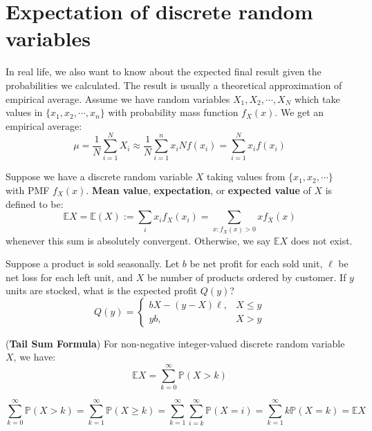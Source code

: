 \documentclass{huhtakm-template-book}
\newcommand{\prob}{\mathbb{P}}
\newcommand{\expect}{\mathbb{E}}
\begin{document}
\section{Expectation of discrete random variables}
In real life, we also want to know about the expected final result given the probabilities we calculated. The result is usually a theoretical approximation of empirical average. Assume we have random variables $X_{1},X_{2},\cdots,X_{N}$ which take values in $\{x_{1},x_{2},\cdots,x_{n}\}$ with probability mass function $f_{X}(x)$. We get an empirical average:
\begin{equation*}
	\mu=\frac{1}{N}\sum_{i=1}^{N}X_{i}\approx\frac{1}{N}\sum_{i=1}^{n}x_{i}Nf(x_{i})=\sum_{i=1}^{N}x_{i}f(x_{i})
\end{equation*}
\begin{defn}
	Suppose we have a discrete random variable $X$ taking values from $\{x_{1},x_{2},\cdots\}$ with PMF $f_{X}(x)$. \textbf{Mean value}, \textbf{expectation}, or \textbf{expected value} of $X$ is defined to be:
	\begin{equation*}
		\expect X=\expect(X):=\sum_{i}x_{i}f_{X}(x_{i})=\sum_{x:f_{X}(x)>0}xf_{X}(x)
	\end{equation*}
	whenever this sum is absolutely convergent. Otherwise, we say $\expect X$ does not exist.
\end{defn}
\begin{eg}
	Suppose a product is sold seasonally. Let $b$ be net profit for each sold unit, $\ell$ be net loss for each left unit, and $X$ be number of products ordered by customer. If $y$ units are stocked, what is the expected profit $Q(y)$?
	\begin{equation*}
		Q(y)=\begin{cases}
			bX-(y-X)\ell, &X\leq y\\
			yb, &X>y
		\end{cases}
	\end{equation*}
\end{eg}
\begin{thm}(\textbf{Tail Sum Formula})
	For non-negative integer-valued discrete random variable $X$, we have:
	\begin{equation*}
		\expect{X}=\sum_{k=0}^{\infty}\prob(X>k)
	\end{equation*}
\end{thm}
\begin{proofing}
	\begin{equation*}
		\sum_{k=0}^{\infty}\prob(X>k)=\sum_{k=1}^{\infty}\prob(X\geq k)=\sum_{k=1}^{\infty}\sum_{i=k}^{\infty}\prob(X=i)=\sum_{k=1}^{\infty}k\prob(X=k)=\expect X
	\end{equation*}
\end{proofing}
\end{document}
